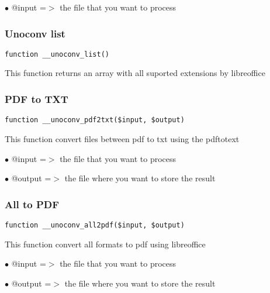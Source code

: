 \documentclass[a4paper]{article}
\begin{document}
\begin{compactitem}
\item[\color{myblue}$\bullet$] @input =$>$ the file that you want to process
\end{compactitem}

\hypertarget{toc534}{}
\subsubsection{Unoconv list}

\begin{lstlisting}
function __unoconv_list()
\end{lstlisting}

This function returns an array with all suported extensions by libreoffice

\hypertarget{toc535}{}
\subsubsection{PDF to TXT}

\begin{lstlisting}
function __unoconv_pdf2txt($input, $output)
\end{lstlisting}

This function convert files between pdf to txt using the pdftotext

\begin{compactitem}
\item[\color{myblue}$\bullet$] @input  =$>$ the file that you want to process
\item[\color{myblue}$\bullet$] @output =$>$ the file where you want to store the result
\end{compactitem}

\hypertarget{toc536}{}
\subsubsection{All to PDF}

\begin{lstlisting}
function __unoconv_all2pdf($input, $output)
\end{lstlisting}

This function convert all formats to pdf using libreoffice

\begin{compactitem}
\item[\color{myblue}$\bullet$] @input  =$>$ the file that you want to process
\item[\color{myblue}$\bullet$] @output =$>$ the file where you want to store the result
\end{compactitem}
\end{document}
